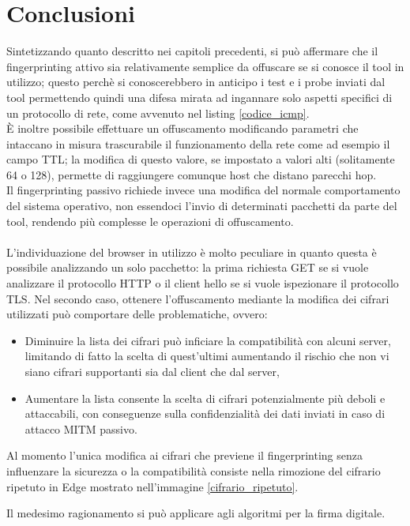 \chapter{Conclusioni}
Sintetizzando quanto descritto nei capitoli precedenti, si può affermare che il fingerprinting attivo sia relativamente semplice da offuscare se si conosce il tool in utilizzo; questo perchè si conoscerebbero in anticipo i test e i probe inviati dal tool permettendo quindi una difesa mirata ad ingannare solo aspetti specifici di un protocollo di rete, come avvenuto nel listing \ref{codice_icmp}.
\\
È inoltre possibile effettuare un offuscamento modificando parametri che intaccano in misura trascurabile il funzionamento della rete come ad esempio il campo TTL; la modifica di questo valore, se impostato a valori alti (solitamente 64 o 128), permette di raggiungere comunque host che distano parecchi hop.
\\
Il fingerprinting passivo richiede invece una modifica del normale comportamento del sistema operativo, non essendoci l'invio di determinati pacchetti da parte del tool, rendendo più complesse le operazioni di offuscamento.
\\
\\
L'individuazione del browser in utilizzo è molto peculiare in quanto questa è possibile analizzando un solo pacchetto: la prima richiesta GET se si vuole analizzare il protocollo HTTP o il client hello se si vuole ispezionare il protocollo TLS.
Nel secondo caso, ottenere l'offuscamento mediante la modifica dei cifrari utilizzati può comportare delle problematiche, ovvero:
\begin{itemize}
	\item Diminuire la lista dei cifrari può inficiare la compatibilità con alcuni server, limitando di fatto la scelta di quest'ultimi aumentando il rischio che non vi siano cifrari supportanti sia dal client che dal server,
	\item Aumentare la lista consente la scelta di cifrari potenzialmente più deboli e attaccabili, con conseguenze sulla confidenzialità dei dati inviati in caso di attacco MITM passivo.
\end{itemize}

Al momento l'unica modifica ai cifrari che previene il fingerprinting senza influenzare la sicurezza o la compatibilità consiste nella rimozione del cifrario ripetuto in Edge mostrato nell'immagine \ref{cifrario_ripetuto}.

Il medesimo ragionamento si può applicare agli algoritmi per la firma digitale.


